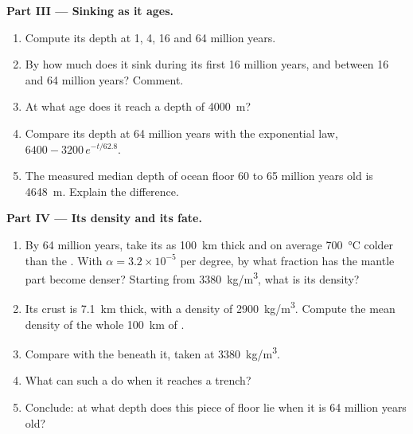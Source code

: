 \begin{problem}
\medskip
\noindent\textbf{Part III --- Sinking as it ages.}
\begin{enumerate}[resume]
  \item Compute its depth at 1, 4, 16 and 64 million years.
  \item By how much does it sink during its first 16 million years, and
        between 16 and 64 million years? Comment.
  \item At what age does it reach a depth of \qty{4000}{m}?
  \item Compare its depth at 64 million years with the exponential law,
        $6400 - 3200\,e^{-t/62.8}$.
  \item The measured median depth of ocean floor 60 to 65 million years old
        is \qty{4648}{m}. Explain the difference.
\end{enumerate}

\medskip
\noindent\textbf{Part IV --- Its density and its fate.}
\begin{enumerate}[resume]
  \item By 64 million years, take its  as \qty{100}{km} thick and
        on average \qty{700}{\celsius} colder than the . With
        $\alpha = 3.2 \times 10^{-5}$ per degree, by what fraction has the
        mantle part become denser? Starting from \qty{3380}{kg/m^3}, what is
        its density?
  \item Its crust is \qty{7.1}{km} thick, with a density of
        \qty{2900}{kg/m^3}. Compute the mean density of the whole
        \qty{100}{km} of .
  \item Compare with the  beneath it, taken at
        \qty{3380}{kg/m^3}.
  \item What can such a  do when it reaches a trench?
  \item Conclude: at what depth does this piece of floor lie when it is 64
        million years old?
\end{enumerate}
\end{problem}
